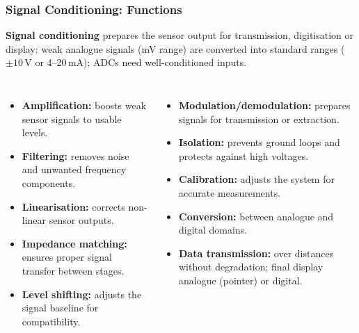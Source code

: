 \begin{frame}
	\frametitle{Signal Conditioning: Functions}
	\small
	\textbf{Signal conditioning} prepares the sensor output for transmission, digitisation or display: weak analogue signals (mV range) are converted into standard ranges ($\pm 10$\,V or 4--20\,mA); ADCs need well-conditioned inputs.
	\begin{columns}[T,onlytextwidth]
		\begin{itemize}
			\item \textbf{Amplification:} boosts weak sensor signals to usable levels.
			\item \textbf{Filtering:} removes noise and unwanted frequency components.
			\item \textbf{Linearisation:} corrects non-linear sensor outputs.
			\item \textbf{Impedance matching:} ensures proper signal transfer between stages.
			\item \textbf{Level shifting:} adjusts the signal baseline for compatibility.
		\end{itemize}
		\begin{itemize}
			\item \textbf{Modulation/demodulation:} prepares signals for transmission or extraction.
			\item \textbf{Isolation:} prevents ground loops and protects against high voltages.
			\item \textbf{Calibration:} adjusts the system for accurate measurements.
			\item \textbf{Conversion:} between analogue and digital domains.
			\item \textbf{Data transmission:} over distances without degradation; final display analogue (pointer) or digital.
		\end{itemize}
	\end{columns}
\end{frame}

